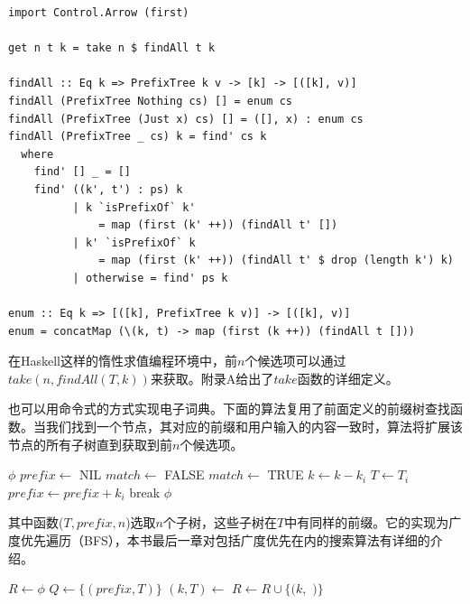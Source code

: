 \documentclass[b5paper]{ctexart}
\begin{document}
\lstset{language=Haskell}
\begin{lstlisting}[style=Haskell]
import Control.Arrow (first)

get n t k = take n $ findAll t k

findAll :: Eq k => PrefixTree k v -> [k] -> [([k], v)]
findAll (PrefixTree Nothing cs) [] = enum cs
findAll (PrefixTree (Just x) cs) [] = ([], x) : enum cs
findAll (PrefixTree _ cs) k = find' cs k
  where
    find' [] _ = []
    find' ((k', t') : ps) k
          | k `isPrefixOf` k'
              = map (first (k' ++)) (findAll t' [])
          | k' `isPrefixOf` k
              = map (first (k' ++)) (findAll t' $ drop (length k') k)
          | otherwise = find' ps k

enum :: Eq k => [([k], PrefixTree k v)] -> [([k], v)]
enum = concatMap (\(k, t) -> map (first (k ++)) (findAll t []))
\end{lstlisting}

在Haskell这样的惰性求值编程环境中，前$n$个候选项可以通过$take(n, findAll(T, k))$来获取。附录A给出了$take$函数的详细定义。

也可以用命令式的方式实现电子词典。下面的算法复用了前面定义的前缀树查找函数。当我们找到一个节点，其对应的前缀和用户输入的内容一致时，算法将扩展该节点的所有子树直到获取到前$n$个候选项。

\begin{algorithmic}[1]
     \State \Return $\phi$
  \EndIf
  \State $prefix \gets$ NIL
  \Repeat
    \State $match \gets$ FALSE
        \State \Return {}
      \EndIf
        \State $match \gets$ TRUE
        \State $k \gets k - k_i$
        \State $T \gets T_i$
        \State $prefix \gets prefix + k_i$
        \State break
      \EndIf
    \EndFor
  \State \Return $\phi$
\EndFunction
\end{algorithmic}

其中函数($T, prefix, n$)选取$n$个子树，这些子树在$T$中有同样的前缀。它的实现为广度优先遍历（BFS），本书最后一章对包括广度优先在内的搜索算法有详细的介绍。

\begin{algorithmic}[1]
  \State $R \gets \phi$
  \State $Q \gets \{(prefix, T)\}$
    \State $(k, T) \gets$ 
      \State $R \gets R \cup \{(k, $  $)\}$
    \EndIf
      \State {}
    \EndFor
  \EndWhile
\EndFunction
\end{algorithmic}
\end{document}
